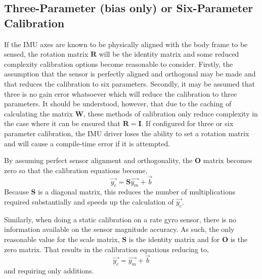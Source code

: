 \documentclass[10pt,letterpaper]{memoir} %
\begin{document}
   
\subsection{Three-Parameter (bias only) or Six-Parameter Calibration}
If the IMU axes are known to be physically aligned with the body frame to be sensed, the rotation matrix $\mathbf{R}$ will be the identity matrix and some reduced complexity calibration options become reasonable to consider.  Firstly, the assumption that the sensor is perfectly aligned and orthogonal may be made and that reduces the calibration to six parameters.  Secondly, it may be assumed that three is no gain error whatsoever which will reduce the calibration to three parameters.  It should be understood, however, that due to the caching of calculating the matrix $\mathbf{W}$, these methods of calibration only reduce complexity in the case where it can be ensured that $\mathbf{R} = \mathbf{I}$.  If configured for three or six parameter calibration, the IMU driver loses the ability to set a rotation matrix and will cause a compile-time error if it is attempted.

By assuming perfect sensor alignment and orthogonality, the $\mathbf{O}$ matrix becomes zero so that the calibration equations become,
\begin{equation}
	\vec{y_c} = \mathbf{S}\vec{y_m} + \vec{b}
\end{equation}
Because $\mathbf{S}$ is a diagonal matrix, this reduces the number of multiplications required substantially and speeds up the calculation of $\vec{y_c}$.

Similarly, when doing a static calibration on a rate gyro sensor, there is no information available on the sensor magnitude accuracy.  As such, the only reasonable value for the scale matrix, $\mathbf{S}$ is the identity matrix and for $\mathbf{O}$ is the zero matrix.  That results in the calibration equations reducing to,
\begin{equation}
\vec{y_c} = \vec{y_m} + \vec{b}
\end{equation}
and requiring only additions.
\end{document}
